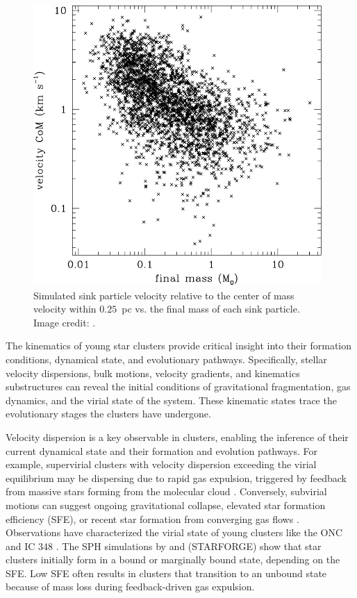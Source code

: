 \documentclass[12pt]{ucsddissertation}
\begin{document}
\begin{CJK*}{UTF8}{gbsn}
\begin{figure}[htb!]
    \centering
    \includegraphics[width=0.7\linewidth]{figures/intro/Bonnell-vrel-mass.pdf}
    \caption[Simulated relative velocity vs. stellar mass in infalling gas filament]{Simulated sink particle velocity relative to the center of mass velocity within $0.25$~pc vs. the final mass of each sink particle. Image credit: \citet{Bonnell-2008}.}
    \label{fig:bonnell}
\end{figure}

The kinematics of young star clusters provide critical insight into their formation conditions, dynamical state, and evolutionary pathways. Specifically, stellar velocity dispersions, bulk motions, velocity gradients, and kinematics substructures can reveal the initial conditions of gravitational fragmentation, gas dynamics, and the virial state of the system. These kinematic states trace the evolutionary stages the clusters have undergone. 

Velocity dispersion is a key observable in clusters, enabling the inference of their current dynamical state and their formation and evolution pathways. For example, supervirial clusters with velocity dispersion exceeding the virial equilibrium may be dispersing due to rapid gas expulsion, triggered by feedback from massive stars forming from the molecular cloud \citep[e.g.,][]{Goodwin-2006, Offner-2009}. Conversely, subvirial motions can suggest ongoing gravitational collapse, elevated star formation efficiency (SFE), or recent star formation from converging gas flows \citep[e.g.,][]{Kruijssen-2012}. Observations have characterized the virial state of young clusters like the ONC and IC 348 \citep[][]{Cottaar-2015, Theissen-2022}. The SPH simulations by \citet{Offner-2009} and \citet{Grudic-2021} (STARFORGE) show that star clusters initially form in a bound or marginally bound state, depending on the SFE. Low SFE often results in clusters that transition to an unbound state because of mass loss during feedback-driven gas expulsion.


\end{CJK*}
\end{document}
